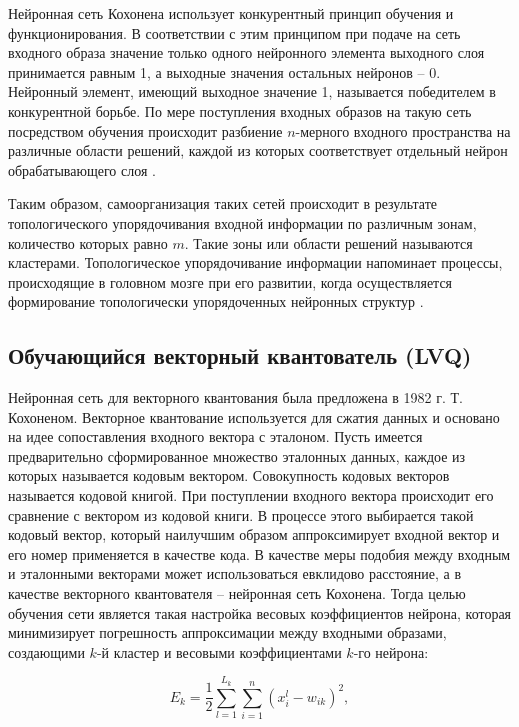 \documentclass[bachelor, och, referat]{template}
\begin{document}
Нейронная сеть Кохонена использует конкурентный принцип обучения 
и функционирования. В соответствии с этим принципом при подаче 
на сеть входного образа значение только одного нейронного элемента 
выходного слоя принимается равным 1, а выходные значения остальных 
нейронов -- 0. Нейронный элемент, имеющий выходное значение 1, 
называется победителем в конкурентной борьбе. По мере поступления 
входных образов на такую сеть посредством обучения происходит 
разбиение $n$-мерного входного пространства на различные области 
решений, каждой из которых соответствует отдельный нейрон 
обрабатывающего слоя \cite{nn1}.

Таким образом, самоорганизация таких сетей происходит в результате 
топологического упорядочивания входной информации по различным
зонам, количество которых равно $m$. Такие зоны или области решений
называются кластерами. Топологическое упорядочивание информации
напоминает процессы, происходящие в головном мозге при его развитии, 
когда осуществляется формирование топологически упорядоченных
нейронных структур \cite{nn2}.

\subsection{Обучающийся векторный квантователь (LVQ)}

Нейронная сеть для векторного квантования была предложена в
1982 г. Т. Кохоненом. Векторное квантование используется для
сжатия данных и основано на идее сопоставления входного вектора с
эталоном. Пусть имеется предварительно сформированное множество 
эталонных данных, каждое из которых называется кодовым вектором. 
Совокупность кодовых векторов называется кодовой книгой. При
поступлении входного вектора происходит его сравнение с вектором из
кодовой книги. В процессе этого выбирается такой кодовый вектор,
который наилучшим образом аппроксимирует входной вектор и его
номер применяется в качестве кода. В качестве меры подобия
между входным и эталонными векторами может использоваться евклидово 
расстояние, а в качестве векторного квантователя -- нейронная
сеть Кохонена. Тогда целью обучения сети является такая настройка
весовых коэффициентов нейрона, которая минимизирует погрешность
аппроксимации между входными образами, создающими $k$-й кластер и
весовыми коэффициентами $k$-го нейрона:

\begin{equation}
    E_k = \frac{1}{2} \sum_{l = 1}^{L_k} \sum_{i = 1}^{n} (x_i^l - w_{ik})^2,
\end{equation}
\end{document}

